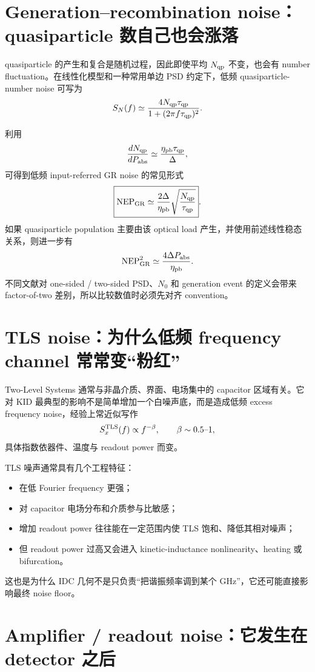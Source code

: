 \documentclass[11pt,a4paper,openany]{ctexrep}
\begin{document}
\section{Generation--recombination noise：quasiparticle 数自己也会涨落}

quasiparticle 的产生和复合是随机过程，因此即使平均 $N_{\rm qp}$ 不变，也会有 number fluctuation。在线性化模型和一种常用单边 PSD 约定下，低频 quasiparticle-number noise 可写为
\[
S_N(f)
\simeq
\frac{4N_{\rm qp}\tau_{\rm qp}}
{1+(2\pi f\tau_{\rm qp})^2}.
\]

利用
\[
\frac{dN_{\rm qp}}{dP_{\rm abs}}
\simeq
\frac{\eta_{\rm pb}\tau_{\rm qp}}{\Delta},
\]
可得到低频 input-referred GR noise 的常见形式
\[
\boxed{
\mathrm{NEP}_{\rm GR}
\simeq
\frac{2\Delta}{\eta_{\rm pb}}
\sqrt{\frac{N_{\rm qp}}{\tau_{\rm qp}}}
}.
\]
如果 quasiparticle population 主要由该 optical load 产生，并使用前述线性稳态关系，则进一步有
\[
\mathrm{NEP}_{\rm GR}^2
\simeq
\frac{4\Delta P_{\rm abs}}{\eta_{\rm pb}}.
\]
不同文献对 one-sided / two-sided PSD、$N_0$ 和 generation event 的定义会带来 factor-of-two 差别，所以比较数值时必须先对齐 convention。

\section{TLS noise：为什么低频 frequency channel 常常变“粉红”}

Two-Level Systems 通常与非晶介质、界面、电场集中的 capacitor 区域有关。它对 KID 最典型的影响不是简单增加一个白噪声底，而是造成低频 excess frequency noise，经验上常近似写作
\[
S_x^{\rm TLS}(f)\propto f^{-\beta},
\qquad \beta\sim 0.5\text{--}1,
\]
具体指数依器件、温度与 readout power 而变。

TLS 噪声通常具有几个工程特征：
\begin{itemize}
  \item 在低 Fourier frequency 更强；
  \item 对 capacitor 电场分布和介质参与比敏感；
  \item 增加 readout power 往往能在一定范围内使 TLS 饱和、降低其相对噪声；
  \item 但 readout power 过高又会进入 kinetic-inductance nonlinearity、heating 或 bifurcation。
\end{itemize}

这也是为什么 IDC 几何不是只负责“把谐振频率调到某个 GHz”，它还可能直接影响最终 noise floor。

\section{Amplifier / readout noise：它发生在 detector 之后}
\end{document}
